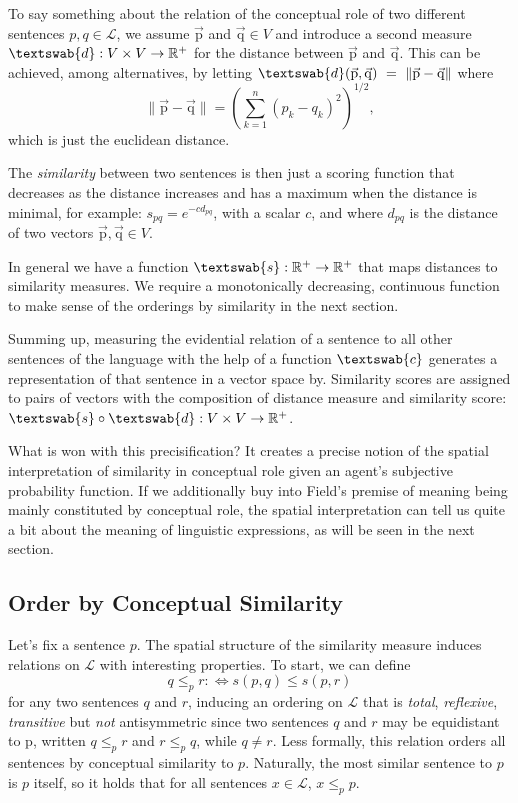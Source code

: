 \documentclass[11pt, a4paper]{scrartcl}
\renewcommand{\i}[1]{\emph{#1}}
\renewcommand{\L}{\mathcal{L}}
\renewcommand{\v}[1]{\vec{\mathrm{#1}}}
\newcommand{\m}[1]{\textswab{#1}}
\begin{document}
To say something about the relation of the conceptual role of two different sentences $p, q \in \L$, we assume $\v{p}$ and $\v{q} \in V$ and introduce a second measure $\m{d}: V \times V \rightarrow \mathbb{R}^+$ for the distance between $\v{p}$ and $\v{q}$. This can be achieved, among alternatives, by letting ${\m{d}(\v{p}, \v{q})~=~\lVert \v{p} - \v{q} \rVert}$ where 
\[
    \lVert \v{p}-\v{q} \rVert = {\left( \sum_{k=1}^n {(p_k-q_k)}^2 \right)}^{1/2}, 
\]
which is just the euclidean distance. 

The \i{similarity} between two sentences is then just a scoring function that decreases as the distance increases and has a maximum when the distance is minimal, for example: $s_{pq} = e^{-cd_{pq}}$, with a scalar $c$, and where $d_{pq}$ is the distance of two vectors $\v{p}, \v{q} \in V$. 

In general we have a function ${\m{s}: \mathbb{R}^+ \rightarrow \mathbb{R}^+ }$ that maps distances to similarity measures. We require a monotonically decreasing, continuous function to make sense of the orderings by similarity in the next section. 

Summing up, measuring the evidential relation of a sentence to all other sentences of the language with the help of a function $\m{c}$ generates a representation of that sentence in a vector space by. Similarity scores are assigned to pairs of vectors with the composition of distance measure and similarity score: ${\m{s}\circ \m{d} : V \times V \rightarrow \mathbb{R}^+}$.

What is won with this precisification? It creates a precise notion of the spatial interpretation of similarity in conceptual role given an agent's subjective probability function. If we additionally buy into Field's premise of meaning being mainly constituted by conceptual role, the spatial interpretation can tell us quite a bit about the meaning of linguistic expressions, as will be seen in the next section.

\subsection{Order by Conceptual Similarity}\label{sec:order}

Let's fix a sentence $p$. The spatial structure of the similarity measure induces relations on $\L$ with interesting properties. To start, we can define 
\[
    q \leqslant_p r :\Leftrightarrow s(p,q) \leqslant s(p,r)
\]
for any two sentences $q$ and $r$, inducing an ordering on $\L$ that is \i{total}, \i{reflexive}, \i{transitive} but \i{not} antisymmetric since two sentences $q$ and $r$ may be equidistant to p, written $q \leqslant_p r$ and $r \leqslant_p q$, while $q \not = r$. Less formally, this relation orders all sentences by conceptual similarity to $p$. Naturally, the most similar sentence to $p$ is $p$ itself, so it holds that for all sentences ${x \in \L}$, ${x\leqslant_p p}$.
\end{document}
